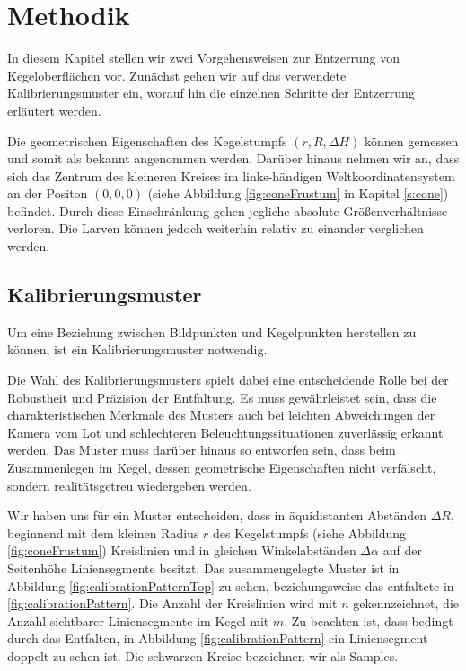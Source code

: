 \chapter{Methodik}
\label{ch:method}
In diesem Kapitel stellen wir zwei Vorgehensweisen zur Entzerrung von Kegeloberflächen vor. 
Zunächst gehen wir auf das verwendete Kalibrierungsmuster ein, worauf hin die einzelnen Schritte der Entzerrung erläutert werden. 

Die geometrischen Eigenschaften des Kegelstumpfs $(r, R, \Delta H)$ können gemessen und somit als bekannt angenommen werden. 
Darüber hinaus nehmen wir an, dass sich das Zentrum des kleineren Kreises im links-händigen Weltkoordinatensystem an der Positon $(0,0,0)$ (siehe Abbildung \ref{fig:coneFrustum} in Kapitel \ref{s:cone}) befindet. Durch diese Einschränkung gehen jegliche absolute Größenverhältnisse verloren. Die Larven können jedoch weiterhin relativ zu einander verglichen werden. 


\section{Kalibrierungsmuster}
\label{s:calibrationPattern}
Um eine Beziehung zwischen Bildpunkten und Kegelpunkten herstellen zu können, ist ein Kalibrierungsmuster notwendig.

Die Wahl des Kalibrierungsmusters spielt dabei eine entscheidende Rolle bei der Robustheit und Präzision der Entfaltung. Es muss gewährleistet sein, dass die charakteristischen Merkmale des Musters auch bei leichten Abweichungen der Kamera vom Lot und schlechteren Beleuchtungssituationen zuverlässig erkannt werden. Das Muster muss darüber hinaus so entworfen sein, dass beim Zusammenlegen im Kegel, dessen geometrische Eigenschaften nicht verfälscht, sondern realitätsgetreu wiedergeben werden. 

Wir haben uns für ein Muster entscheiden, dass in äquidistanten Abständen $\Delta R$, beginnend mit dem kleinen Radius $r$ des Kegelstumpfs (siehe Abbildung \ref{fig:coneFrustum}) Kreislinien und in gleichen Winkelabständen $\Delta \alpha$ auf der Seitenhöhe Liniensegmente besitzt. Das zusammengelegte Muster ist in Abbildung \ref{fig:calibrationPatternTop} zu sehen, beziehungsweise das entfaltete in \ref{fig:calibrationPattern}. Die Anzahl der Kreislinien wird mit $n$ gekennzeichnet, die Anzahl sichtbarer Liniensegmente im Kegel mit $m$. Zu beachten ist, dass bedingt durch das Entfalten, in Abbildung \ref{fig:calibrationPattern}  ein Liniensegment doppelt zu sehen ist. Die schwarzen Kreise bezeichnen wir als Samples. 

